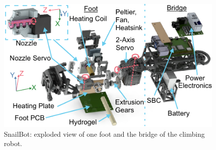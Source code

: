 \begin{figure}
  \includegraphics[width=\linewidth]{figures/fig-7-snailbot-closeup-placeholder/fig-7-snailbot-closeup-placeholder.pdf}
  \caption{SnailBot: exploded view of one foot and the bridge of the climbing robot.}
  \label{fig:fig7-placeholder}
\end{figure}


